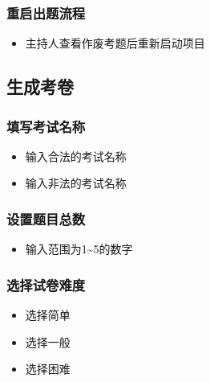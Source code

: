 \documentclass[hyperref, a4paper]{ctexart}
\providecommand{\tightlist}{%
  \setlength{\itemsep}{0pt}\setlength{\parskip}{0pt}}
\begin{document}
\hypertarget{ux91cdux542fux51faux9898ux6d41ux7a0b}{%
\subsubsection{重启出题流程}\label{ux91cdux542fux51faux9898ux6d41ux7a0b}}

\begin{itemize}
\tightlist
\item
  主持人查看作废考题后重新启动项目
\end{itemize}

\hypertarget{ux751fux6210ux8003ux5377}{%
\subsection{生成考卷}\label{ux751fux6210ux8003ux5377}}

\hypertarget{ux586bux5199ux8003ux8bd5ux540dux79f0}{%
\subsubsection{填写考试名称}\label{ux586bux5199ux8003ux8bd5ux540dux79f0}}

\begin{itemize}
\tightlist
\item
  输入合法的考试名称
\item
  输入非法的考试名称
\end{itemize}

\hypertarget{ux8bbeux7f6eux9898ux76eeux603bux6570}{%
\subsubsection{设置题目总数}\label{ux8bbeux7f6eux9898ux76eeux603bux6570}}

\begin{itemize}
\tightlist
\item
  输入范围为1\textasciitilde{}5的数字
\end{itemize}

\hypertarget{ux9009ux62e9ux8bd5ux5377ux96beux5ea6}{%
\subsubsection{选择试卷难度}\label{ux9009ux62e9ux8bd5ux5377ux96beux5ea6}}

\begin{itemize}
\tightlist
\item
  选择简单
\item
  选择一般
\item
  选择困难
\end{itemize}
\end{document}
